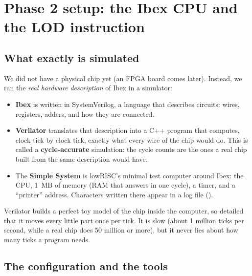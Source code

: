 \section{Phase 2 setup: the Ibex CPU and the LOD instruction}\label{sec:ibex}

\subsection{What exactly is simulated}

We did not have a physical chip yet (an FPGA board comes later). Instead, we ran the \emph{real hardware
description} of Ibex in a simulator:
\begin{itemize}
  \item \textbf{Ibex} is written in SystemVerilog, a language that describes circuits: wires, registers,
        adders, and how they are connected.
  \item \textbf{Verilator} translates that description into a C++ program that computes, clock tick by
        clock tick, exactly what every wire of the chip would do. This is called a
        \textbf{cycle-accurate} simulation: the cycle counts are the ones a real chip built from the same
        description would have.
  \item The \textbf{Simple System} is lowRISC's minimal test computer around Ibex: the CPU, 1~MB of
        memory (RAM that answers in one cycle), a timer, and a ``printer'' address. Characters written there
        appear in a log file ().
\end{itemize}

\begin{kid}
Verilator builds a perfect toy model of the chip inside the computer, so detailed that it moves every
little part once per tick. It is slow (about 1 million ticks per second, while a real chip does 50
million or more), but it never lies about how many ticks a program needs.
\end{kid}

\subsection{The configuration and the tools}

